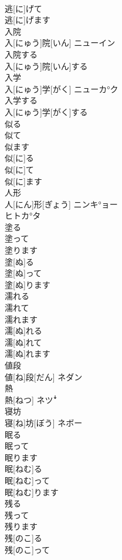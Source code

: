 \documentclass[8pt]{extreport}
\begin{document}
\begin{CJK}{UTF8}{min}
\\	逃[に]げて 
\\	逃[に]げます	
\\	入院	
\\	入[にゅう]院[いん]	ニューイン
\\	入院する	
\\	入[にゅう]院[いん]する	
\\	入学	
\\	入[にゅう]学[がく]	ニューカ°ク
\\	入学する	
\\	入[にゅう]学[がく]する	
\\	似る 
\\	似て 
\\	似ます	
\\	似[に]る 
\\	似[に]て 
\\	似[に]ます	
\\	人形	
\\	人[にん]形[ぎょう]	ニンキ°ョー 
\\	ヒトカ°タ
\\	塗る 
\\	塗って 
\\	塗ります	
\\	塗[ぬ]る 
\\	塗[ぬ]って 
\\	塗[ぬ]ります	
\\	濡れる 
\\	濡れて 
\\	濡れます	
\\	濡[ぬ]れる 
\\	濡[ぬ]れて 
\\	濡[ぬ]れます	
\\	値段	
\\	値[ね]段[だん]	ネダン
\\	熱	
\\	熱[ねつ]	ネツꜜ
\\	寝坊	
\\	寝[ね]坊[ぼう]	ネボー
\\	眠る 
\\	眠って 
\\	眠ります	
\\	眠[ねむ]る 
\\	眠[ねむ]って 
\\	眠[ねむ]ります	
\\	残る 
\\	残って 
\\	残ります	
\\	残[のこ]る 
\\	残[のこ]って 

\end{CJK}
\end{document}
